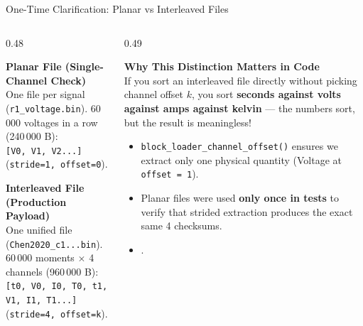 \begin{frame}{One-Time Clarification: Planar vs Interleaved Files}
  \begin{columns}[t, onlytextwidth]
    \begin{column}{0.48\textwidth}
      \smalltext\compactitem
      \begin{tech}
        \textbf{Planar File (Single-Channel Check)} \\
        One file per signal (\texttt{r1\_voltage.bin}). 60\,000 voltages in a row (240\,000 B): \\
        \texttt{[V0, V1, V2...]} (\texttt{stride=1, offset=0}).
      \end{tech}
      \vskip1mm
      \begin{tech}
        \textbf{Interleaved File (Production Payload)} \\
        One unified file (\texttt{Chen2020\_c1...bin}). 60\,000 moments $\times$ 4 channels (960\,000 B): \\
        \texttt{[t0, V0, I0, T0, t1, V1, I1, T1...]} \\
        (\texttt{stride=4, offset=k}).
      \end{tech}
    \end{column}
    \begin{column}{0.49\textwidth}
      \smalltext\compactitem
      \begin{highlight}
        \textbf{Why This Distinction Matters in Code} \\
        If you sort an interleaved file directly without picking channel offset $k$, you sort \textbf{seconds against volts against amps against kelvin} — the numbers sort, but the result is meaningless!
      \end{highlight}
      \vskip1mm
      \begin{itemize}
        \item \texttt{block\_loader\_channel\_offset()} ensures we extract only one physical quantity (Voltage at \texttt{offset = 1}).
        \item Planar files were used \textbf{only once in tests} to verify that strided extraction produces the exact same 4 checksums.
        \item {}.
      \end{itemize}
    \end{column}
  \end{columns}
\end{frame}

